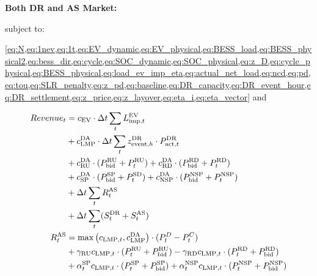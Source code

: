 \documentclass[conference]{IEEEtran}
\begin{document}
\textbf{Both DR and AS Market:}

subject to: 

\cref{eq:N,eq:1nev,eq:1t,eq:EV_dynamic,eq:EV_physical,eq:BESS_load,eq:BESS_physical2,eq:bess_dir,eq:cycle,eq:SOC_dynamic,eq:SOC_physical,eq:z_D,eq:cycle_physical,eq:BESS_physical,eq:load_ev_imp_eta,eq:actual_net_load,eq:ncd,eq:pd,eq:tou,eq:SLR_penalty,eq:z_pd,eq:baseline,eq:DR_capacity,eq:DR_event_hour,eq:DR_settlement,eq:z_price,eq:z_layover,eq:eta_i,eq:eta_vector} and

\begin{align}
    Revenue_t &= c_{\text{EV}} \cdot \Delta t \sum_t L^{\text{EV}}_{\text{imp},t} \\
    &+ c_{\text{LMP}}^{\text{DA}} \cdot \Delta t \sum_t z_{\text{event},h}^{\text{DR}} \cdot P_{\text{act},t}^{\text{DR}} \\
    &+ c_{\text{RU}}^{\text{DA}} \cdot (P^{\text{RU}}_{\text{bid}} + P^{\text{RU}}_t) + c_{\text{RD}}^{\text{DA}} \cdot (P^{\text{RD}}_{\text{bid}} + P^{\text{RD}}_t) \notag \\
    &+ c_{\text{SP}}^{\text{DA}} \cdot (P^{\text{SP}}_{\text{bid}} + P^{\text{SD}}_t) + c_{\text{NSP}}^{\text{DA}} \cdot (P^{\text{NSP}}_{\text{bid}} + P^{\text{NSP}}_t) \label{eq:AS_DA_capacity_revenue} \\
    &+ \Delta t \sum_t R^{\text{AS}}_t \\
    &+ \Delta t \sum_t (S_t^{\text{DR}} + S_t^{\text{AS}}) \\
    R^{\text{AS}}_t &= \max \left(c_{\text{LMP},t},  c_{\text{LMP}}^\text{DA} \right) \cdot (P^D_t - P^C_t) \label{eq:energy_arb} \\
    &+ \gamma_{\text{RU}} c_{\text{LMP},t} \cdot (P^{\text{RU}}_t + P^{\text{RU}}_{\text{bid}}) - \gamma_{\text{RD}} c_{\text{LMP},t} \cdot (P^{\text{RD}}_t + P^{\text{RD}}_{\text{bid}}) \notag \\
    &+ \alpha^{\text{SP}}_t c_{\text{LMP},t} \cdot (P^{\text{SP}}_t + P^{\text{SP}}_{\text{bid}}) + \alpha^{\text{NSP}}_t c_{\text{LMP},t} \cdot (P^{\text{NSP}}_t + P^{\text{NSP}}_{\text{bid}}) \label{eq:AS_energy_revenue}
\end{align}
\end{document}
